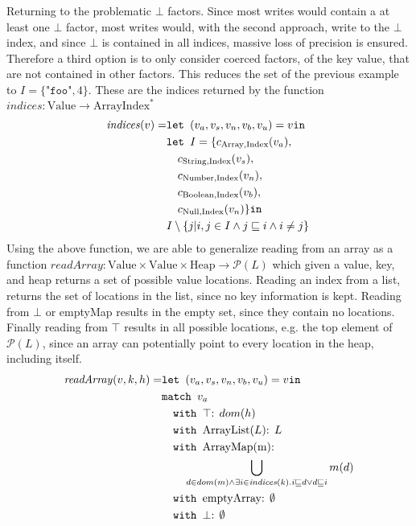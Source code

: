 Returning to the problematic $\bot$ factors. Since most writes would contain a at least one $\bot$ factor, most writes would, with the second approach, write to the $\bot$ index, and since $\bot$ is contained in all indices, massive loss of precision is ensured. Therefore a third option is to only consider coerced factors, of the key value, that are not contained in other factors. This reduces the set of the previous example to $I = \{\texttt{"foo"}, 4\}$. These are the indices returned by the function $\mathit{indices}: \text{Value} \rightarrow \text{ArrayIndex}^*$
\newcommand{\is}{\texttt{ is }}
\begin{align}
    \mathit{indices}(v) =    &\texttt{let } (v_a,v_s, v_n, v_b, v_u) = v \texttt{in }\notag\\
                    & \texttt{let } I = \{ c_{\text{Array}, \text{Index}}(v_a),\notag\\
                    &\quad c_{\text{String}, \text{Index}}(v_s),\notag\\
                    &\quad c_{\text{Number}, \text{Index}}(v_n),\notag\\
                    &\quad c_{\text{Boolean}, \text{Index}}(v_b),\notag\\
                    &\quad c_{\text{Null}, \text{Index}}(v_n) \} \texttt{in }\notag\\
                    &I \setminus \{j|i,j\in I \wedge j\sqsubseteq i \wedge i \neq j \}
\end{align}
Using the above function, we are able to generalize reading from an array as a function $\mathit{readArray}: \text{Value} \times \text{Value} \times \text{Heap} \rightarrow \mathcal{P}(L)$ which given a value, key, and heap returns a set of possible value locations. Reading an index from a list, returns the set of locations in the list, since no key information is kept. Reading from $\bot$ or { emptyMap} results in the empty set, since they contain no locations. Finally reading from $\top$ results in all possible locations, e.g. the top element of $\mathcal{P}(L)$, since an array can potentially point to every location in the heap, including itself.
\begin{align}
\mathit{readArray}(v,k,h) =            &\texttt{let } (v_a,v_s,v_n,v_b,v_u) = v \texttt{in }\notag\\
                            &\texttt{match }v_a\notag\\
                            &\quad\texttt{with }\top\text{: } dom(h) \notag\\
                            &\quad\texttt{with }\text{ArrayList}(L)\text{: } L \notag\\
                            &\quad\texttt{with }\text{ArrayMap(m)}\text{: } \notag\\
                            & \quad\quad \bigcup_{d \in dom(m) \wedge \exists i \in \mathit{indices}(k).i\sqsubseteq d \vee d \sqsubseteq i } m(d)\notag\\
                            &\quad\texttt{with }\text{emptyArray}\text{: } \emptyset \notag\\
                            &\quad\texttt{with }\bot\text{: } \emptyset
\end{align}

